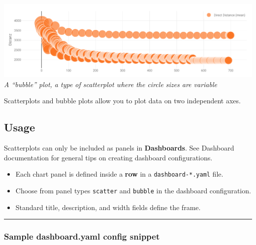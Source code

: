 \includegraphics{assets/bubbles.png} \emph{A ``bubble'' plot, a type of
scatterplot where the circle sizes are variable}

Scatterplots and bubble plots allow you to plot data on two independent
axes.

\hypertarget{usage}{%
\subsection{Usage}\label{usage}}

Scatterplots can only be included as panels in \textbf{Dashboards}. See
Dashboard documentation for general tips on creating dashboard
configurations.

\begin{itemize}
\tightlist
\item
  Each chart panel is defined inside a \textbf{row} in a
  \texttt{dashboard-*.yaml} file.
\item
  Choose from panel types \texttt{scatter} and \texttt{bubble} in the
  dashboard configuration.
\item
  Standard title, description, and width fields define the frame.
\end{itemize}

\begin{center}\rule{0.5\linewidth}{0.5pt}\end{center}

\hypertarget{sample-dashboard.yaml-config-snippet}{%
\subsubsection{Sample dashboard.yaml config
snippet}\label{sample-dashboard.yaml-config-snippet}}

